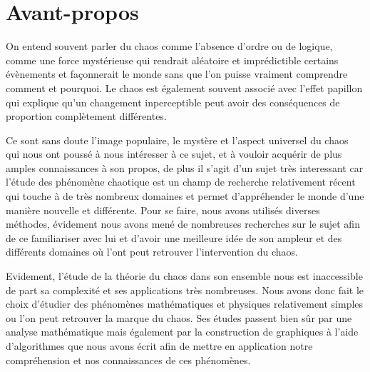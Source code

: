 \chapter*{Avant-propos}
On entend souvent parler du chaos comme l'absence d'ordre ou de logique, comme une force mystérieuse qui 
rendrait aléatoire et imprédictible certains évènements et façonnerait le monde sans que l'on puisse vraiment comprendre comment et pourquoi. Le chaos est également souvent associé avec l'effet papillon 
qui explique qu'un changement inperceptible peut avoir des conséquences de proportion complètement différentes.

Ce sont sans doute l'image populaire, le mystère et l'aspect universel du chaos qui nous ont poussé à nous intéresser à ce sujet, et à vouloir acquérir de plus amples connaissances à son propos, de plus il s'agit d'un sujet très interessant car l'étude des phénomène chaotique est un champ de recherche relativement récent qui touche à de très nombreux domaines et permet d'appréhender le monde d'une manière nouvelle et différente.  Pour se faire, nous avons utilisés diverses méthodes, évidement nous avons mené de nombreuses recherches sur le sujet afin de ce familiariser avec lui et d'avoir une meilleure idée de son ampleur et des différents domaines où l'ont peut retrouver l'intervention du chaos. 

Evidement, l'étude de la théorie du chaos dans son ensemble nous est inaccessible de part sa complexité et ses applications très nombreuses. Nous avons donc fait le choix d'étudier des phénomènes mathématiques et physiques relativement simples ou l'on peut retrouver la marque du chaos. Ses études passent bien sûr par une analyse mathématique mais également par la construction de graphiques à l'aide d'algorithmes que nous avons écrit afin de mettre en application notre compréhension et nos connaissances de ces phénomènes.

